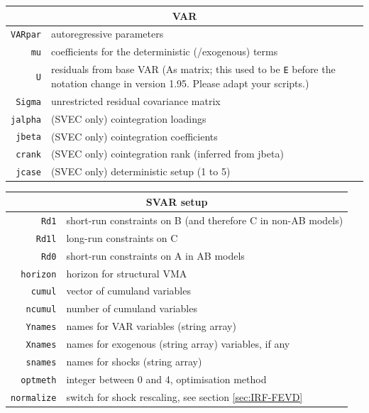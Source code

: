 \documentclass[a4paper,10pt]{article}
\newcounter{script}[section]
\begin{document}
    \begin{tabular}{rp{}}
    \hline
    \multicolumn{2}{c}{\textbf{VAR}} \\
    \hline
    \texttt{VARpar} & autoregressive parameters \\
    \texttt{mu}	    & coefficients for the deterministic (/exogenous) terms \\
    \texttt{U}	    & residuals from base VAR (As matrix; this used to be
     \texttt{E} before the notation change in version 1.95.
      Please adapt your scripts.) \\
    \texttt{Sigma}  & unrestricted residual covariance matrix \\
    \texttt{jalpha} & (SVEC only) cointegration loadings \\
    \texttt{jbeta}  & (SVEC only) cointegration coefficients \\
    \texttt{crank} & (SVEC only) cointegration rank (inferred from jbeta)\\
    \texttt{jcase} & (SVEC only) deterministic setup (1 to 5)\\
     \end{tabular}
    
    \begin{tabular}{rp{}}
    \hline
    \multicolumn{2}{c}{\textbf{SVAR setup}} \\
    \hline
    \texttt{Rd1}	 & short-run constraints on B (and therefore C in non-AB models) \\
    \texttt{Rd1l}	 & long-run constraints on C \\
    \texttt{Rd0}	 & short-run constraints on A in AB models \\
    \texttt{horizon}	 & horizon for structural VMA \\
    \texttt{cumul}	 & vector of cumuland variables \\
    \texttt{ncumul}	 & number of cumuland variables \\
    \texttt{Ynames}	 & names for VAR variables (string array)\\
    \texttt{Xnames}	 & names for exogenous (string array)
    variables, if any \\
    \texttt{snames}	 & names for shocks (string array) \\
    \texttt{optmeth}	 & integer between 0 and 4, optimisation method \\
    \texttt{normalize} & switch for shock rescaling, see section \ref{sec:IRF-FEVD} \\
     \end{tabular}
    
\end{document}
